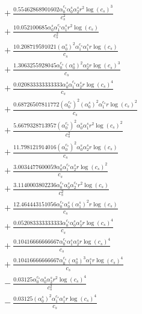 \documentclass[10pt]{article}
\begin{document}
\begin{align*}
&{}  + \frac{0.55462868901602 \alpha_{0}^{c_s} \alpha_{0}^s \alpha_{2}^s r^{2} \log{\left(c_{s} \right)}^{3}}{c_{s}^{2}} \\
&{}  + \frac{10.052100685 \alpha_{0}^s \alpha_{1}^{c_s} \alpha_{1}^s r^{2} \log{\left(c_{s} \right)}}{c_{s}^{2}} \\
&{}  + \frac{10.208719591021 \left(\alpha_{0}^s\right)^{2} \alpha_{1}^{c_s} \alpha_{1}^s r \log{\left(c_{s} \right)}}{c_{s}} \\
&{}  + \frac{1.3063255928045 \alpha_{0}^{c_s} \left(\alpha_{0}^s\right)^{2} \alpha_{2}^s r \log{\left(c_{s} \right)}^{3}}{c_{s}} \\
&{}  + \frac{0.020833333333333 \alpha_{0}^s \alpha_{1}^{c_s} \alpha_{2}^s r \log{\left(c_{s} \right)}^{4}}{c_{s}} \\
&{}  + \frac{0.68726507811772 \left(\alpha_{0}^{c_s}\right)^{2} \left(\alpha_{0}^s\right)^{2} \alpha_{1}^{c_s} r \log{\left(c_{s} \right)}^{2}}{c_{s}} \\
&{}  + \frac{5.6679328713957 \left(\alpha_{0}^{c_s}\right)^{2} \alpha_{0}^s \alpha_{1}^s r^{2} \log{\left(c_{s} \right)}^{2}}{c_{s}^{2}} \\
&{}  + \frac{11.798121914016 \left(\alpha_{0}^{c_s}\right)^{2} \alpha_{0}^s \alpha_{2}^s r \log{\left(c_{s} \right)}}{c_{s}} \\
&{}  + \frac{3.0034477600059 \alpha_{0}^s \alpha_{1}^{c_s} \alpha_{2}^s r \log{\left(c_{s} \right)}^{2}}{c_{s}} \\
&{}  + \frac{3.1140003802236 \alpha_{0}^{c_s} \alpha_{0}^s \alpha_{2}^{c_s} r^{2} \log{\left(c_{s} \right)}}{c_{s}^{2}} \\
&{}  + \frac{12.464443151056 \alpha_{0}^{c_s} \alpha_{0}^s \left(\alpha_{1}^s\right)^{2} r \log{\left(c_{s} \right)}}{c_{s}} \\
&{}  + \frac{0.052083333333333 \alpha_{0}^{c_s} \alpha_{0}^s \alpha_{3}^s r \log{\left(c_{s} \right)}^{4}}{c_{s}} \\
&{}  + \frac{0.10416666666667 \alpha_{0}^{c_s} \alpha_{1}^s \alpha_{2}^s r \log{\left(c_{s} \right)}^{4}}{c_{s}} \\
&{}  + \frac{0.10416666666667 \alpha_{0}^{c_s} \left(\alpha_{0}^s\right)^{3} \alpha_{1}^s r \log{\left(c_{s} \right)}^{4}}{c_{s}} \\
&{}  - \frac{0.03125 \alpha_{0}^{c_s} \alpha_{0}^s \alpha_{2}^s r^{2} \log{\left(c_{s} \right)}^{4}}{c_{s}^{2}} \\
&{}  - \frac{0.03125 \left(\alpha_{0}^s\right)^{2} \alpha_{1}^{c_s} \alpha_{1}^s r \log{\left(c_{s} \right)}^{4}}{c_{s}} \\

\end{align*}
\end{document}
